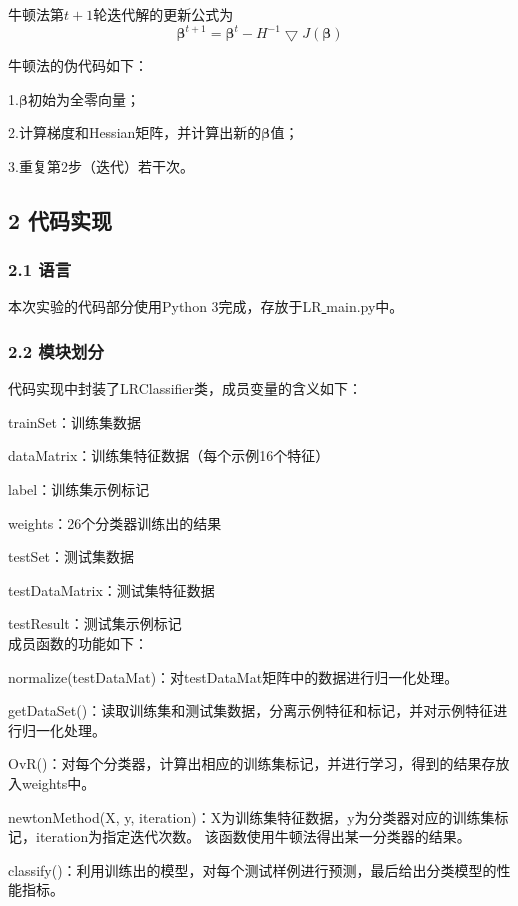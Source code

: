 \documentclass{article}
\begin{document}
牛顿法第$t+1$轮迭代解的更新公式为
\begin{equation*}
    \bm{\beta}^{t+1}=\bm{\beta}^{t}-H^{-1}\bigtriangledown J(\bm{\beta})
\end{equation*}

牛顿法的伪代码如下：

1.$\bm{\beta}$初始为全零向量；

2.计算梯度和Hessian矩阵，并计算出新的$\bm{\beta}$值；

3.重复第2步（迭代）若干次。



\subsection*{2 代码实现}
\subsubsection*{2.1 语言}
本次实验的代码部分使用Python 3完成，存放于LR\underline{  }main.py中。

\subsubsection*{2.2 模块划分}
代码实现中封装了LRClassifier类，成员变量的含义如下：

trainSet：训练集数据

dataMatrix：训练集特征数据（每个示例16个特征）

label：训练集示例标记

weights：26个分类器训练出的结果

testSet：测试集数据

testDataMatrix：测试集特征数据

testResult：测试集示例标记
\\

成员函数的功能如下：

normalize(testDataMat)：对testDataMat矩阵中的数据进行归一化处理。

getDataSet()：读取训练集和测试集数据，分离示例特征和标记，并对示例特征进行归一化处理。

OvR()：对每个分类器，计算出相应的训练集标记，并进行学习，得到的结果存放入weights中。

newtonMethod(X, y, iteration)：X为训练集特征数据，y为分类器对应的训练集标记，iteration为指定迭代次数。
该函数使用牛顿法得出某一分类器的结果。

classify()：利用训练出的模型，对每个测试样例进行预测，最后给出分类模型的性能指标。
\end{document}
